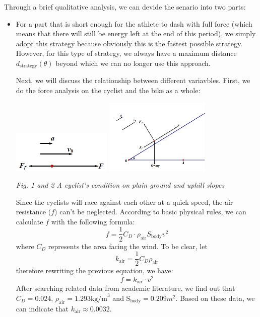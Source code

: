 \documentclass{article}
\begin{document}
			Through a brief qualitative analysis, we can devide the senario into two parts:
			\begin{itemize}
				\item For a part that is short enough for the athlete to dash with full force (which means that there will still be energy left at the end of this period), we simply adopt this strategy because obviously this is the fastest possible strategy. However, for this type of strategy, we always have a maximum distance \(d_{\mathrm{strategy}}\left(\theta\right)\) beyond which we can no longer use this approach.


					Next, we will discuss the relationship between different variavbles. First, we do the force analysis on the cyclist and the bike as a whole:

					\begin{center}
						\includegraphics[height=2cm]{4.png}
						\includegraphics[width=5cm]{5.png}

						\small \textit{Fig. 1 and 2 A cyclist's condition on plain ground and uphill slopes}
					\end{center}

					Since the cyclists will race against each other at a quick speed, the air resistance ($f$) can't be neglected. According to basic physical rules, we can calculate \(f\) with the following formula:
					$$f=\dfrac{1}{2}  C _ D  \cdot \rho_\mathrm{air} S_\mathrm{body} v^2$$
					where \(C_D\) represents the area facing the wind. To be clear, let
					$$ k _\mathrm{air}=\dfrac{1}{2}  C _ D  \rho_\mathrm{air}$$
					therefore rewriting the previous equation, we have:
					$$f= k _\mathrm{air}\cdot v^2$$
					After searching related data from academic literature, we find out that $ C _ D =0.024$, $\rho_\mathrm{air}=1.293 \mathrm{kg/m}^3$ and $\mathrm{S}_\mathrm{body}=0.209 m^2$. Based on these data, we can indicate that $ k _\mathrm{air}\approx0.0032$.


\end{itemize}
\end{document}
